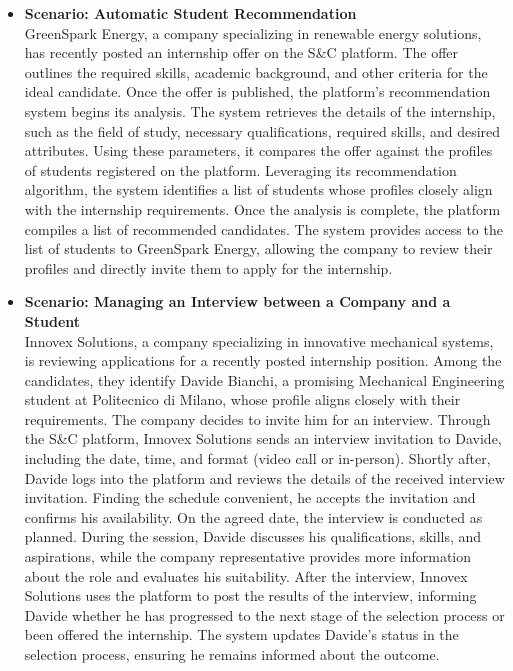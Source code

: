 \begin{itemize}
        \incscenario
    \item \textbf{\nth{\thescenario} Scenario: Automatic Student Recommendation}
    \\
        GreenSpark Energy, a company specializing in renewable energy solutions, has recently posted an internship offer on the S\&C platform. The offer outlines the required skills, academic background, and other criteria for the ideal candidate. Once the offer is published, the platform's recommendation system begins its analysis.
        The system retrieves the details of the internship, such as the field of study, necessary qualifications, required skills, and desired attributes. Using these parameters, it compares the offer against the profiles of students registered on the platform. Leveraging its recommendation algorithm, the system identifies a list of students whose profiles closely align with the internship requirements.
        Once the analysis is complete, the platform compiles a list of recommended candidates. The system provides access to the list of students to GreenSpark Energy, allowing the company to review their profiles and directly invite them to apply for the internship. 
        \incscenario
    \item \textbf{\nth{\thescenario} Scenario: Managing an Interview between a Company and a Student}
    \\
        Innovex Solutions, a company specializing in innovative mechanical systems, is reviewing applications for a recently posted internship position. Among the candidates, they identify Davide Bianchi, a promising Mechanical Engineering student at Politecnico di Milano, whose profile aligns closely with their requirements. The company decides to invite him for an interview.
        Through the S\&C platform, Innovex Solutions sends an interview invitation to Davide, including the date, time, and format (video call or in-person). Shortly after, Davide logs into the platform and reviews the details of the received interview invitation. Finding the schedule convenient, he accepts the invitation and confirms his availability.
        On the agreed date, the interview is conducted as planned. During the session, Davide discusses his qualifications, skills, and aspirations, while the company representative provides more information about the role and evaluates his suitability.
        After the interview, Innovex Solutions uses the platform to post the results of the interview, informing Davide whether he has progressed to the next stage of the selection process or been offered the internship.
        The system updates Davide's status in the selection process, ensuring he remains informed about the outcome. 
        \incscenario
        

\end{itemize}
